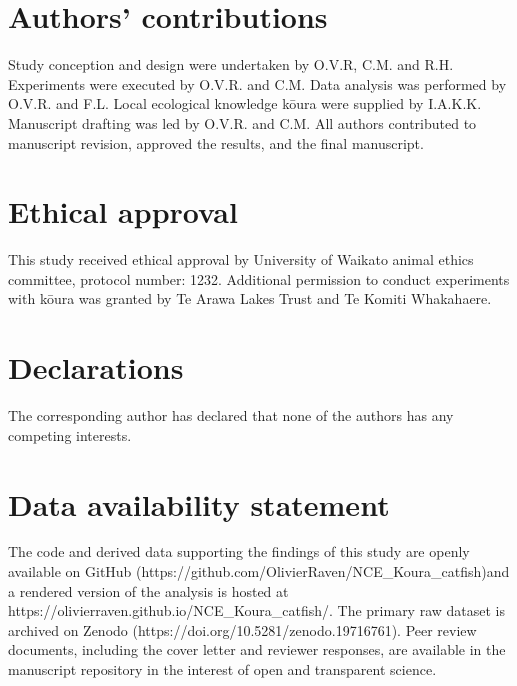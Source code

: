 \documentclass[
  letterpaper,
  DIV=11,
  numbers=noendperiod]{scrartcl}
\newcounter{none} %
\begin{document}
\section*{Authors' contributions}\label{authors-contributions}

Study conception and design were undertaken by O.V.R, C.M. and R.H.
Experiments were executed by O.V.R. and C.M. Data analysis was performed
by O.V.R. and F.L. Local ecological knowledge kōura were supplied by
I.A.K.K. Manuscript drafting was led by O.V.R. and C.M. All authors
contributed to manuscript revision, approved the results, and the final
manuscript.

\section*{Ethical approval}\label{ethical-approval}

This study received ethical approval by University of Waikato animal
ethics committee, protocol number: 1232. Additional permission to
conduct experiments with kōura was granted by Te Arawa Lakes Trust and
Te Komiti Whakahaere.

\section*{Declarations}\label{declarations}

The corresponding author has declared that none of the authors has any
competing interests.

\section*{Data availability
statement}\label{data-availability-statement}

The code and derived data supporting the findings of this study are
openly available on GitHub
(https://github.com/OlivierRaven/NCE\_Koura\_catfish)and a rendered
version of the analysis is hosted at
https://olivierraven.github.io/NCE\_Koura\_catfish/. The primary raw
dataset is archived on Zenodo (https://doi.org/10.5281/zenodo.19716761).
Peer review documents, including the cover letter and reviewer
responses, are available in the manuscript repository in the interest of
open and transparent science.
\end{document}
